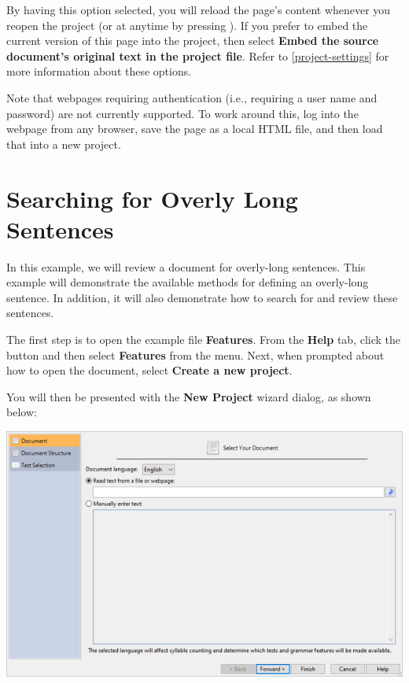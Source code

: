 \documentclass[
]{book}
\theoremstyle{definition}
\theoremstyle{definition}
\theoremstyle{definition}
\theoremstyle{definition}
\theoremstyle{remark}
\begin{document}
By having this option selected, you will reload the page's content whenever you reopen the project (or at anytime by pressing ). If you prefer to embed the current version of this page into the project, then select \textbf{Embed the source document's original text in the project file}. Refer to \ref{project-settings} for more information about these options.

Note that webpages requiring authentication (i.e., requiring a user name and password) are not currently supported. To work around this, log into the webpage from any browser, save the page as a local HTML file, and then load that into a new project.

\hypertarget{searching-for-overly-long-sentences}{%
\section{Searching for Overly Long Sentences}\label{searching-for-overly-long-sentences}}

In this example, we will review a document for overly-long sentences. This example will demonstrate the available methods for defining an overly-long sentence. In addition, it will also demonstrate how to search for and review these sentences.

The first step is to open the example file \textbf{Features}. From the \textbf{Help} tab, click the  button and then select \textbf{Features} from the menu. Next, when prompted about how to open the document, select \textbf{Create a new project}.

You will then be presented with the \textbf{New Project} wizard dialog, as shown below:

\includegraphics{Images/wizard1.png}
\end{document}
